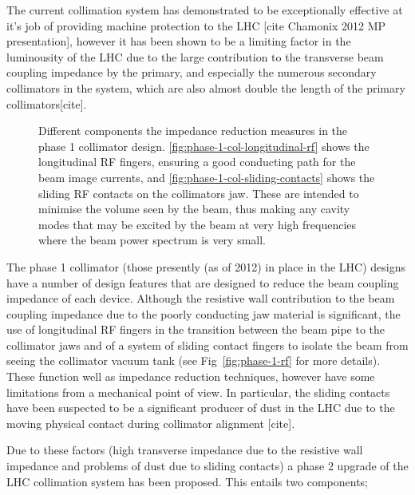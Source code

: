 The current collimation system has demonstrated to be exceptionally effective at it's job of providing machine protection to the LHC [cite Chamonix 2012 MP presentation], however it has been shown to be a limiting factor in the luminousity of the LHC due to the large contribution to the transverse beam coupling impedance by the primary, and especially the numerous secondary collimators in the system, which are also almost double the length of the primary collimators[cite]. 

\begin{figure}
\subfigure[]{
\label{fig:phase-1-col-longitudinal-rf}
}
\subfigure[]{
\label{fig:phase-1-col-sliding-contacts}
}
\label{fig:pĥase-1-rf}
\caption{Different components the impedance reduction measures in the phase 1 collimator design. \ref{fig:phase-1-col-longitudinal-rf} shows the longitudinal RF fingers, ensuring a good conducting path for the beam image currents, and \ref{fig:phase-1-col-sliding-contacts} shows the sliding RF contacts on the collimators jaw. These are intended to minimise the volume seen by the beam, thus making any cavity modes that may be excited by the beam at very high frequencies where the beam power spectrum is very small.}
\end{figure}

The phase 1 collimator (those presently (as of 2012) in place in the LHC) designs have a number of design features that are designed to reduce the beam coupling impedance of each device. Although the resistive wall contribution to the beam coupling impedance due to the poorly conducting jaw material is significant, the use of longitudinal RF fingers in the transition between the beam pipe to the collimator jaws and of a system of sliding contact fingers to isolate the beam from seeing the collimator vacuum tank (see Fig~\ref{fig:phase-1-rf} for more details). These function well as impedance reduction techniques, however have some limitations from a mechanical point of view. In particular, the sliding contacts have been suspected to be a significant producer of dust in the LHC due to the moving physical contact during collimator alignment [cite]. 

Due to these factors (high transverse impedance due to the resistive wall impedance and problems of dust due to sliding contacts) a phase 2 upgrade of the LHC collimation system has been proposed. This entails two components;

